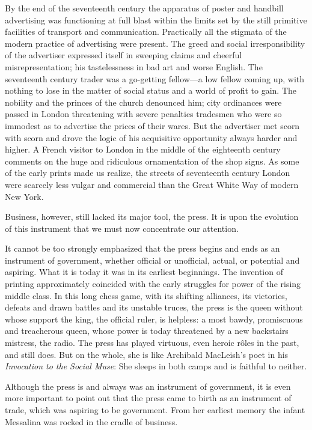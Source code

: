 \documentclass[twoside,nohyper,openany,nobib]{tufte-book}
\begin{document}
By the end of the seventeenth century the apparatus of poster and
handbill advertising was functioning at full blast within the limits set
by the still primitive facilities of transport and communication.
Practically all the stigmata of the modern practice of advertising were
present. The greed and social irresponsibility of the advertiser
expressed itself in sweeping claims and cheerful misrepresentation; his
tastelessness in bad art and worse English. The seventeenth century
trader was a go-getting fellow---a low fellow coming up, with nothing to
lose in the matter of social status and a world of profit to gain. The
nobility and the princes of the church denounced him; city ordinances
were passed in London threatening with severe penalties tradesmen who
were so immodest as to advertise the prices of their wares. But the
advertiser met scorn with scorn and drove the logic of his acquisitive
opportunity always harder and higher. A French visitor to London in the
middle of the eighteenth century comments on the huge and ridiculous
ornamentation of the shop signs. As some of the early prints made us
realize, the streets of seventeenth century London were scarcely less
vulgar and commercial than the Great White Way of modern New York.

Business, however, still lacked its major tool, the press. It is upon
the evolution of this instrument that we must now concentrate our
attention.

It cannot be too strongly emphasized that the press begins and ends as
an instrument of government, whether official or unofficial, actual, or
potential and aspiring. What it is today it was in its earliest
beginnings. The invention of printing approximately coincided with the
early struggles for power of the rising middle class. In this long chess
game, with its shifting alliances, its victories, defeats and drawn
battles and its unstable truces, the press is the queen without whose
support the king, the official ruler, is helpless: a most bawdy,
promiscuous and treacherous queen, whose power is today threatened by a
new backstairs mistress, the radio. The press has played virtuous, even
heroic r\^oles in the past, and still does. But on the whole, she is like
Archibald MacLeish's poet in his \emph{Invocation to the Social Muse}:
She sleeps in both camps and is faithful to neither.

Although the press is and always was an instrument of government, it is
even more important to point out that the press came to birth as an
instrument of trade, which was aspiring to be government. From her
earliest memory the infant Messalina was rocked in the cradle of
business.
\end{document}
